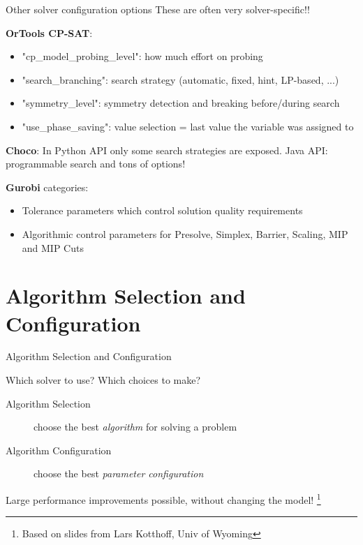 \documentclass{cons-beamer}
\newcommand\blfootnote[1]{%
  \begingroup
  \renewcommand\thefootnote{}\footnote{
  \footnotesize #1
  \vspace*{1em}}%
  \addtocounter{footnote}{-1}%
  \endgroup
}
\begin{document}
\begin{frame}{Other solver configuration options}
    These are often very solver-specific!!
    \vspace{1em}

    \textbf{OrTools CP-SAT}: %
    \begin{itemize}
      \item "cp\_model\_probing\_level": how much effort on probing
      \item "search\_branching": search strategy (automatic, fixed, hint, LP-based, ...)
      \item "symmetry\_level": symmetry detection and breaking before/during search
      \item "use\_phase\_saving": value selection = last value the variable was assigned to
    \end{itemize}

    \textbf{Choco}: %
    In Python API only some search strategies are exposed. Java API: programmable search and tons of options!

    \textbf{Gurobi} categories: %
    \begin{itemize}
      \item Tolerance parameters which control solution quality requirements
      \item Algorithmic control parameters for Presolve, Simplex, Barrier, Scaling, MIP and MIP Cuts%
    \end{itemize}
\end{frame}


\section{Algorithm Selection and Configuration}

\begin{frame}{Algorithm Selection and Configuration}

  Which solver to use? Which choices to make?
  \vspace{1em}

  \begin{description}
    \item[Algorithm Selection] choose the best \emph{algorithm} for solving a
    problem
    \item[Algorithm Configuration] choose the best \emph{parameter configuration}
  \end{description}
  \vspace{1em}

  Large performance improvements possible, without changing the model!
  \blfootnote{Based on slides from Lars Kotthoff, Univ of Wyoming}
\end{frame}
\end{document}
